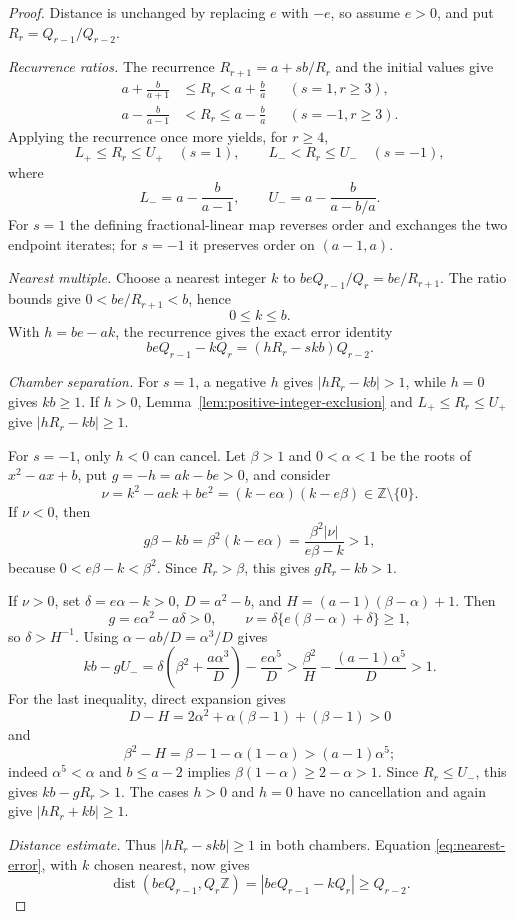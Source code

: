 \begin{proof}
Distance is unchanged by replacing $e$ with $-e$, so assume $e>0$, and put
$R_r=Q_{r-1}/Q_{r-2}$.

\emph{Recurrence ratios.}
The recurrence $R_{r+1}=a+sb/R_r$ and the initial values give
\begin{align}
a+\frac{b}{a+1}&\le R_r<a+\frac ba &&(s=1, r\ge3),
\label{eq:ratio-plus}\\
a-\frac{b}{a-1}&<R_r\le a-\frac ba &&(s=-1, r\ge3).
\label{eq:ratio-minus}
\end{align}
Applying the recurrence once more yields, for $r\ge4$,
\begin{equation}
L_+\le R_r\le U_+\quad(s=1),\qquad
L_-<R_r\le U_-\quad(s=-1),
\label{eq:sharpened-ratio-bounds}
\end{equation}
where
\[
L_-=a-\frac{b}{a-1},\qquad
U_-=a-\frac{b}{a-b/a}.
\]
For $s=1$ the defining fractional-linear map reverses order and exchanges
the two endpoint iterates; for $s=-1$ it preserves order on $(a-1,a)$.

\emph{Nearest multiple.}
Choose a nearest integer $k$ to $beQ_{r-1}/Q_r=be/R_{r+1}$.  The ratio
bounds give $0<be/R_{r+1}<b$, hence
\begin{equation}
0\le k\le b.
\label{eq:nearest-k-bound}
\end{equation}
With $h=be-ak$, the recurrence gives the exact error identity
\begin{equation}
beQ_{r-1}-kQ_r=(hR_r-skb)Q_{r-2}.
\label{eq:nearest-error}
\end{equation}

\emph{Chamber separation.}
For $s=1$, a negative $h$ gives $|hR_r-kb|>1$, while $h=0$ gives
$kb\ge1$.  If $h>0$, Lemma~\ref{lem:positive-integer-exclusion} and
$L_+\le R_r\le U_+$ give $|hR_r-kb|\ge1$.

For $s=-1$, only $h<0$ can cancel.  Let $\beta>1$ and $0<\alpha<1$ be the
roots of $x^2-ax+b$, put $g=-h=ak-be>0$, and consider
\[
\nu=k^2-aek+be^2=(k-e\alpha)(k-e\beta)\in\mathbb Z\setminus\{0\}.
\]
If $\nu<0$, then
\[
g\beta-kb=\beta^2(k-e\alpha)
=\frac{\beta^2|\nu|}{e\beta-k}>1,
\]
because $0<e\beta-k<\beta^2$.  Since $R_r>\beta$, this gives
$gR_r-kb>1$.

If $\nu>0$, set $\delta=e\alpha-k>0$, $D=a^2-b$, and
$H=(a-1)(\beta-\alpha)+1$.  Then
\[
g=e\alpha^2-a\delta>0,\qquad
\nu=\delta\{e(\beta-\alpha)+\delta\}\ge1,
\]
so $\delta>H^{-1}$.  Using $\alpha-ab/D=\alpha^3/D$ gives
\[
kb-gU_-
=\delta\left(\beta^2+\frac{a\alpha^3}{D}\right)
-\frac{e\alpha^5}{D}
>\frac{\beta^2}{H}-\frac{(a-1)\alpha^5}{D}>1.
\]
For the last inequality, direct expansion gives
\[
D-H=2\alpha^2+\alpha(\beta-1)+(\beta-1)>0
\]
and
\[
\beta^2-H=\beta-1-\alpha(1-\alpha)>(a-1)\alpha^5;
\]
indeed $\alpha^5<\alpha$ and $b\le a-2$ implies
$\beta(1-\alpha)\ge2-\alpha>1$.  Since $R_r\le U_-$, this gives
$kb-gR_r>1$.  The cases $h>0$ and $h=0$ have no cancellation and again
give $|hR_r+kb|\ge1$.

\emph{Distance estimate.}
Thus $|hR_r-skb|\ge1$ in both chambers.  Equation
\eqref{eq:nearest-error}, with $k$ chosen nearest, now gives
\[
\operatorname{dist}(beQ_{r-1},Q_r\mathbb Z)
=|beQ_{r-1}-kQ_r|\ge Q_{r-2}.
\]
\end{proof}

